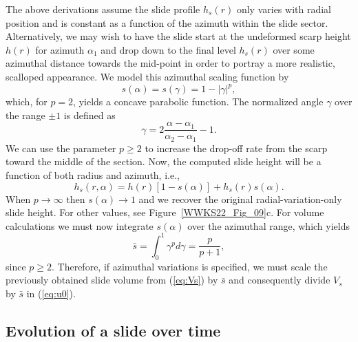 The above derivations assume the slide profile $h_s(r)$ only varies with radial position and is constant as a function
of the azimuth within the slide sector. Alternatively, we may wish to have the slide start at the undeformed scarp height
$h(r)$ for azimuth $\alpha_1$ and drop down to the final level $h_s(r)$ over some azimuthal distance towards the mid-point in order
to portray a more realistic, scalloped appearance. We model this azimuthal scaling function by
\begin{equation*}
s(\alpha) = s(\gamma) = 1 - \left |\gamma\right|^p,
\end{equation*}
which, for $p = 2$, yields a concave parabolic function. The normalized angle $\gamma$ over the range $\pm1$ is defined as
\begin{equation*}
\gamma = 2\frac{\alpha - \alpha_1}{\alpha_2 - \alpha_1} - 1.
\end{equation*}
We can use the parameter $p \ge 2$ to increase the drop-off rate from the scarp toward the middle of the section.
Now, the computed slide height will be a function of both radius and azimuth, i.e.,
\begin{equation*}
h_s(r, \alpha) = h(r) \left [1 - s(\alpha)\right ] + h_s(r) s(\alpha).
\end{equation*}
When $p \rightarrow \infty$ then $s(\alpha) \rightarrow 1$ and we recover the original radial-variation-only slide height.
For other values, see Figure~\ref{WWKS22_Fig_09}c. For volume calculations we must now integrate $s(\alpha)$ over the azimuthal range,
which yields
\begin{equation*}
\bar{s} = \int_0^1  \gamma^p d\gamma = \frac{p}{p+1},
\end{equation*}
since $p \ge 2$. Therefore, if azimuthal variations is specified, we must scale the previously obtained slide volume from
(\ref{eq:Vs}) by $\bar{s}$ and consequently divide $V_s$ by $\bar{s}$ in (\ref{eq:u0}).

\subsection{Evolution of a slide over time}

